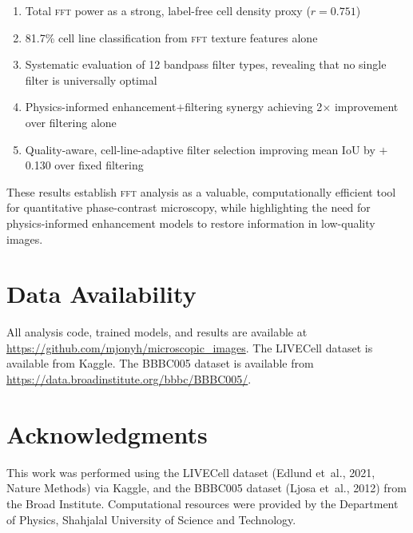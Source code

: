 \documentclass[11pt,a4paper]{article}
\newcommand{\etal}{et~al.\xspace}
\newcommand{\fft}{\textsc{fft}\xspace}
\begin{document}
\begin{enumerate}[nosep]
    \item Total \fft power as a strong, label-free cell density proxy
          ($r{=}0.751$)
    \item 81.7\% cell line classification from \fft texture features alone
    \item Systematic evaluation of 12 bandpass filter types, revealing
          that no single filter is universally optimal
    \item Physics-informed enhancement$+$filtering synergy achieving
          2$\times$ improvement over filtering alone
    \item Quality-aware, cell-line-adaptive filter selection improving
          mean IoU by $+$0.130 over fixed filtering
\end{enumerate}

These results establish \fft analysis as a valuable, computationally
efficient tool for quantitative phase-contrast microscopy, while
highlighting the need for physics-informed enhancement models to restore
information in low-quality images.

\section*{Data Availability}

All analysis code, trained models, and results are available at
\url{https://github.com/mjonyh/microscopic_images}. The LIVECell dataset
is available from Kaggle. The BBBC005 dataset is available from
\url{https://data.broadinstitute.org/bbbc/BBBC005/}.

\section*{Acknowledgments}

This work was performed using the LIVECell dataset (Edlund \etal,
2021, Nature Methods) via Kaggle, and the BBBC005 dataset (Ljosa \etal,
2012) from the Broad Institute. Computational resources were provided by
the Department of Physics, Shahjalal University of Science and Technology.

\end{document}

